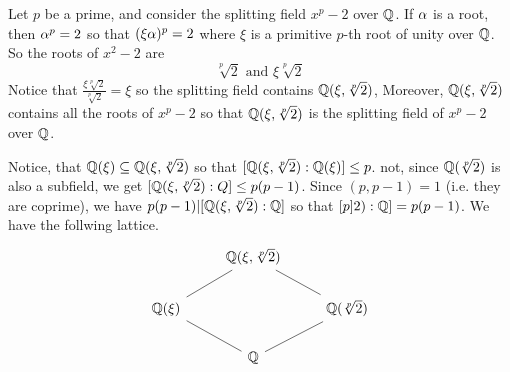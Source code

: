 \begin{example}\label{example_8.13}
  Let $p$ be a prime, and consider the splitting field $x^p-2$ over  $\mathbb{Q}$. If
  $\alpha$ is a root, then $\alpha^p=2$ so that $(\xi\alpha)^p=2$ where $\xi$ is a
  primitive  $p$-th root of unity over  $\mathbb{Q}$. So the roots of $x^2-2$ are
  \begin{equation*}
    \sqrt[p]{2}    \text{ and }  \xi\sqrt[p]{2}
  \end{equation*}
  Notice that $\frac{\xi\sqrt[p]{2}}{\sqrt[p]{2}}=\xi$ so the splitting field
  contains $\mathbb{Q}(\xi,\sqrt[p]{2})$, Moreover, $\mathbb{Q}(\xi,\sqrt[p]{2})$ contains
  all the roots of $x^p-2$ so that  $\mathbb{Q}(\xi,\sqrt[p]{2})$ is the splitting
  field of $x^p-2$ over  $\mathbb{Q}$.

  Notice, that  $\mathbb{Q}(\xi) \subseteq \mathbb{Q}(\xi,\sqrt[p]{2})$ so that
  $[\mathbb{Q}(\xi,\sqrt[p]{2}):\mathbb{Q}(\xi)] \leq p$. not, since $\mathbb{Q}(\sqrt[p]{2})$ is
  also a subfield, we get $[\mathbb{Q}(\xi,\sqrt[p]{2}):Q] \leq p(p-1)$. Since
  $(p,p-1)=1$ (i.e. they are coprime), we have
  $p(p-1)|[\mathbb{Q}(\xi,\sqrt[p]{2}):\mathbb{Q}]$ so that $[p]{2}):\mathbb{Q}]=p(p-1)$. We have the
  follwing lattice.
  \[\begin{tikzcd}
        & {\mathbb{Q}(\xi,\sqrt[p]{2})} \\
    {\mathbb{Q}(\xi)} && {\mathbb{Q}(\sqrt[p]{2})} \\
                      & {\mathbb{Q}}
                      \arrow[no head, from=1-2, to=2-1]
                      \arrow[no head, from=2-1, to=3-2]
                      \arrow[no head, from=3-2, to=2-3]
                      \arrow[no head, from=2-3, to=1-2]
  \end{tikzcd}\]
\end{example}

